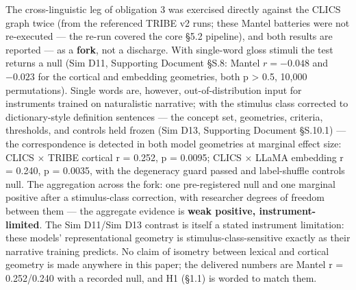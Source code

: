 \documentclass[11pt,twocolumn]{article}
\theoremstyle{plain}
\begin{document}
The cross-linguistic leg of obligation 3 was exercised directly against the CLICS graph twice (from the referenced TRIBE v2 runs; these Mantel batteries were not re-executed --- the re-run covered the core \S{}5.2 pipeline), and both results are reported — as a \textbf{fork}, not a discharge. With single-word gloss stimuli the test returns a null (Sim D11, Supporting Document \S{}S.8: Mantel $r = -0.048$ and $-0.023$ for the cortical and embedding geometries, both p > 0.5, 10,000 permutations). Single words are, however, out-of-distribution input for instruments trained on naturalistic narrative; with the stimulus class corrected to dictionary-style definition sentences — the concept set, geometries, criteria, thresholds, and controls held frozen (Sim D13, Supporting Document \S{}S.10.1) — the correspondence is detected in both model geometries at marginal effect size: CLICS $\times$ TRIBE cortical r = 0.252, p = 0.0095; CLICS $\times$ LLaMA embedding r = 0.240, p = 0.0035, with the degeneracy guard passed and label-shuffle controls null. The aggregation across the fork: one pre-registered null and one marginal positive after a stimulus-class correction, with researcher degrees of freedom between them — the aggregate evidence is \textbf{weak positive, instrument-limited}. The Sim D11/Sim D13 contrast is itself a stated instrument limitation: these models' representational geometry is stimulus-class-sensitive exactly as their narrative training predicts. No claim of isometry between lexical and cortical geometry is made anywhere in this paper; the delivered numbers are Mantel r = 0.252/0.240 with a recorded null, and H1 (\S{}1.1) is worded to match them.
\end{document}
